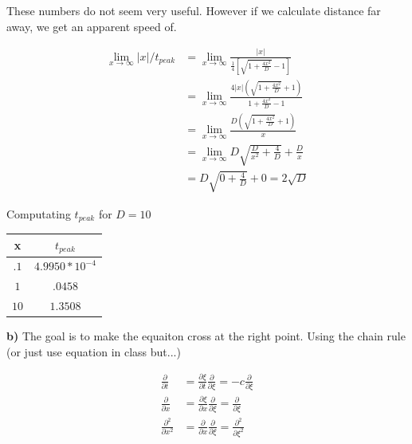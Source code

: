 \documentclass{article}
\begin{document}
These numbers do not seem very useful. However if we calculate distance far away,
we get an apparent speed of.

\begin{align}
    \lim_{x\to \infty} |x|/t_{peak} &= \lim_{x\to \infty} \frac{|x|}{\frac{1}{4}\left[\sqrt{1+ \frac{4x^2}{D}}-1\right]}\\
    &= \lim_{x\to \infty} \frac{4|x|\left(\sqrt{1+ \frac{4x^2}{D}}+1\right)}{1+ \frac{4x^2}{D}-1}\\
    &= \lim_{x\to \infty} \frac{D\left(\sqrt{1+ \frac{4x^2}{D}}+1\right)}{x}\\
    &= \lim_{x\to \infty} D\sqrt{\frac{D}{x^2}+ \frac{4}{D}}+ \frac{D}{x}\\
    & = D\sqrt{0+ \frac{4}{D}} + 0 = 2\sqrt{D}
\end{align}

Computating $t_{peak}$ for $D=10$
\begin{center}
\begin{tabular}{c | c }
    x & $t_{peak}$\\
    \hline 
    $.1$ & $4.9950*10^{-4}$\\  
    $1$ & $.0458$\\
    $10$ & $1.3508$
\end{tabular}
\end{center}

\textbf{b)} The goal is to make the equaiton cross at the right point. Using the chain rule
(or just use equation in class but...)

\begin{align}
    \frac{\partial }{\partial t} &= \frac{\partial \xi}{\partial t}\frac{\partial}{\partial \xi} = -c\frac{\partial }{\partial \xi}\\
    \frac{\partial }{\partial x} &= \frac{\partial \xi}{\partial x}\frac{\partial}{\partial \xi} = \frac{\partial}{\partial \xi}\\
    \frac{\partial ^2}{\partial x^2} &= \frac{\partial}{\partial x} \frac{\partial}{\partial \xi} = \frac{\partial^2}{\partial \xi^2}\\
\end{align}
\end{document}
